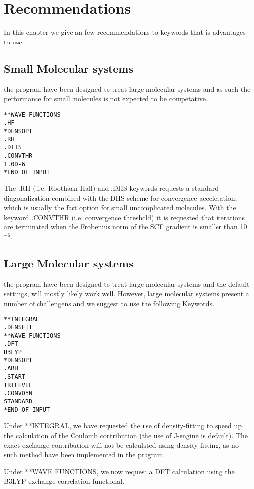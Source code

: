\chapter{Recommendations }\label{recommendations}

In this chapter we give an few recommendations to keywords that is advantages to use 

\section{Small Molecular systems}

the {\lsdalton} program have been designed to treat large molecular systems and as such the performance for small molecules is not expected to be competative.
\begin{verbatim}
**WAVE FUNCTIONS
.HF
*DENSOPT
.RH
.DIIS
.CONVTHR
1.0D-6
*END OF INPUT
\end{verbatim}
The .RH (.i.e. Roothaan-Hall) and .DIIS keywords requests a standard diagonalization combined with the DIIS scheme for convergence acceleration, which is usually the fast option for small uncomplicated molecules. 
With the keyword .CONVTHR (i.e. convergence threshold) it is requested that iterations are terminated when the Frobenius norm of the SCF gradient is smaller than 10$^{-6}$. 

\section{Large Molecular systems}

the {\lsdalton} program have been designed to treat large molecular systems and the default 
settings, will mostly likely work well. However, large molecular systems present a number of 
challengens and we suggest to use the following Keywords.

\begin{verbatim}
**INTEGRAL
.DENSFIT
**WAVE FUNCTIONS
.DFT
B3LYP
*DENSOPT
.ARH
.START
TRILEVEL
.CONVDYN
STANDARD
*END OF INPUT
\end{verbatim}
Under **INTEGRAL, we have requested the use of density-fitting to speed up the calculation of 
the Coulomb contribution (the use of J-engine is default). The exact exchange contribution will not 
be calculated using density fitting, as no such method have been implemented in the {\lsdalton} program.

Under **WAVE FUNCTIONS, we now request a DFT
calculation using the B3LYP exchange-correlation functional.

